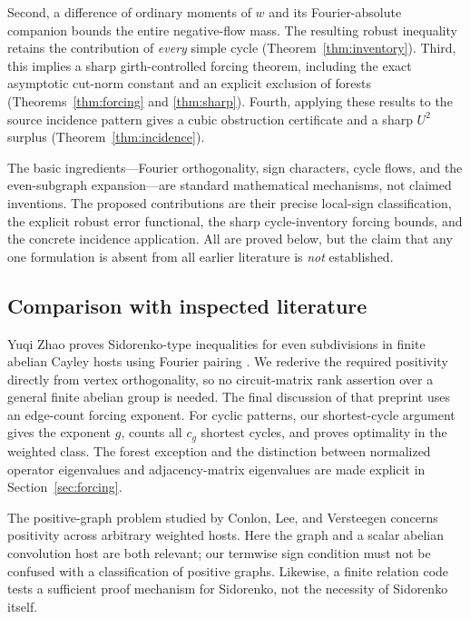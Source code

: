 \documentclass[11pt]{article}
\numberwithin{equation}{section}
\theoremstyle{definition}
\theoremstyle{remark}
\begin{document}
Second, a difference of ordinary moments of $w$ and its Fourier-absolute
companion bounds the entire negative-flow mass. The resulting robust
inequality retains the contribution of \emph{every} simple cycle
(Theorem~\ref{thm:inventory}). Third, this implies a sharp girth-controlled
forcing theorem, including the exact asymptotic cut-norm constant and an
explicit exclusion of forests (Theorems~\ref{thm:forcing} and
\ref{thm:sharp}). Fourth, applying these results to the source incidence
pattern gives a cubic obstruction certificate and a sharp $U^2$ surplus
(Theorem~\ref{thm:incidence}).

The basic ingredients---Fourier orthogonality, sign characters, cycle
flows, and the even-subgraph expansion---are standard mathematical
mechanisms, not claimed inventions. The proposed contributions are their
precise local-sign classification, the explicit robust error functional,
the sharp cycle-inventory forcing bounds, and the concrete incidence
application. All are proved below, but the claim that any one formulation
is absent from all earlier literature is \emph{not} established.

\subsection{Comparison with inspected literature}

Yuqi Zhao proves Sidorenko-type inequalities for even subdivisions in
finite abelian Cayley hosts using Fourier pairing
\cite{YuqiZhao}. We rederive the required positivity directly from vertex
orthogonality, so no circuit-matrix rank assertion over a general finite
abelian group is needed. The final discussion of that preprint uses an
edge-count forcing exponent. For cyclic patterns, our shortest-cycle
argument gives the exponent $g$, counts all $c_g$ shortest cycles, and
proves optimality in the weighted class. The forest exception and the
distinction between normalized operator eigenvalues and adjacency-matrix
eigenvalues are made explicit in Section~\ref{sec:forcing}.

The positive-graph problem studied by Conlon, Lee, and Versteegen
\cite{PositiveGraphs} concerns positivity across arbitrary weighted hosts.
Here the graph and a scalar abelian convolution host are both relevant;
our termwise sign condition must not be confused with a classification
of positive graphs. Likewise, a finite relation code tests a sufficient
proof mechanism for Sidorenko, not the necessity of Sidorenko itself.
\end{document}
